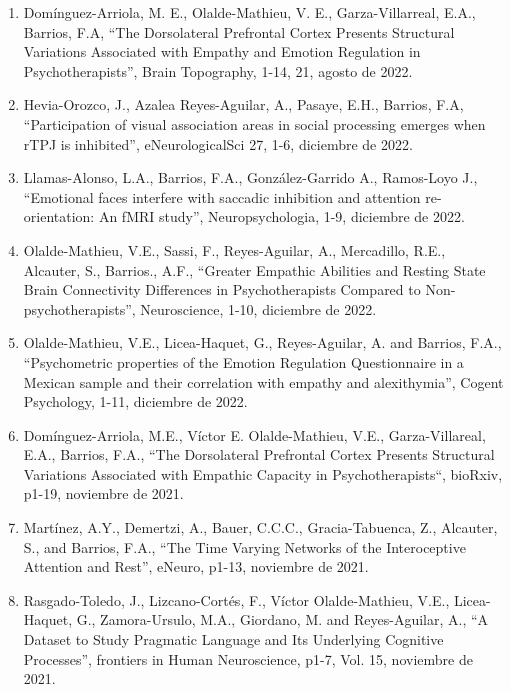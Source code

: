 \begin{enumerate}
\item Domínguez-Arriola, M. E., Olalde-Mathieu, V. E., Garza-Villarreal, E.A., Barrios, F.A, “The Dorsolateral Prefrontal Cortex Presents 
Structural Variations Associated with Empathy and Emotion Regulation in Psychotherapists”, Brain Topography, 1-14, 21, agosto de 2022.

\item Hevia-Orozco, J., Azalea Reyes-Aguilar, A., Pasaye, E.H., Barrios, F.A, “Participation of visual association areas in social processing 
emerges when rTPJ is inhibited”, eNeurologicalSci 27, 1-6, diciembre de 2022.

\item Llamas-Alonso, L.A., Barrios, F.A., González-Garrido A., Ramos-Loyo J., “Emotional faces interfere with saccadic inhibition and 
attention 
re-orientation: An fMRI study”, Neuropsychologia, 1-9, diciembre de 2022.

\item Olalde-Mathieu, V.E., Sassi, F., Reyes-Aguilar, A., Mercadillo, R.E., Alcauter, S., Barrios., A.F., “Greater Empathic Abilities and 
Resting 
State Brain Connectivity Differences in Psychotherapists Compared to Non-psychotherapists”, Neuroscience, 1-10, diciembre de 2022.

\item Olalde-Mathieu, V.E., Licea-Haquet, G., Reyes-Aguilar, A. and Barrios, F.A., “Psychometric properties of the Emotion Regulation 
Questionnaire 
in a Mexican sample and their correlation with empathy and alexithymia”, Cogent Psychology, 1-11, diciembre de 2022.

\item Domínguez-Arriola, M.E., Víctor E. Olalde-Mathieu, V.E., Garza-Villareal, E.A., Barrios, F.A., “The Dorsolateral Prefrontal Cortex 
Presents 
Structural Variations Associated with Empathic Capacity in Psychotherapists“, bioRxiv, p1-19, noviembre de 2021.

\item Martínez, A.Y., Demertzi, A., Bauer, C.C.C., Gracia-Tabuenca, Z., Alcauter, S., and Barrios, F.A., “The Time Varying Networks of the 
Interoceptive Attention and Rest”, eNeuro, p1-13, noviembre de 2021.

\item Rasgado-Toledo, J., Lizcano-Cortés, F., Víctor Olalde-Mathieu, V.E., Licea-Haquet, G., Zamora-Ursulo, M.A., Giordano, M. and 
Reyes-Aguilar, 
A., “A Dataset to Study Pragmatic Language and Its Underlying Cognitive Processes”, frontiers in Human Neuroscience, p1-7, Vol. 15, noviembre 
de 2021.


\end{enumerate}
